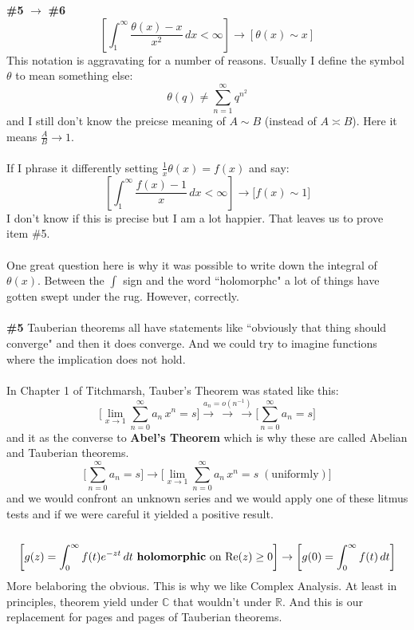 \documentclass[12pt]{article}
\begin{document}
\newpage 

\noindent \textbf{\#5} $\to$ \textbf{\#6}
$$ \left[ \int_1^\infty \frac{\theta(x) - x}{x^2} \, dx < \infty \right] \to \left[ \theta(x) \sim x \right]  $$
This notation is aggravating for a number of reasons.  Usually I define the symbol $\theta$ to mean something else:
$$  \theta(q) \neq \sum_{n=1}^\infty q^{n^2}$$
and I still don't know the preicse meaning of $A\sim B$ (instead of  $A \asymp B$). Here it means $\frac{A}{B} \to 1$. \\ \\ 
If I phrase it differently setting $\frac{1}{x} \theta(x)   = f(x)$ and say:
$$ \left[ \int_1^\infty \frac{f(x)-1}{x} \, dx < \infty \right] \to \big[ f(x) \sim 1 \big]  $$
I don't know if this is precise but I am a lot happier. That leaves us to prove item \#5. \\ \\
One great question here is why it was possible to write down the integral of $\theta(x)$. Between the $\int$ sign and the word ``holomorphc" a lot of things have gotten swept under the rug.  However, correctly. \\ \\
\textbf{\#5} Tauberian theorems all have statements like ``obviously that thing should converge" and then it does converge.  And we could try to imagine functions where the implication does not hold. \\ \\
In Chapter 1 of Titchmarsh, Tauber's Theorem was stated like this:
$$ \Big[ \lim_{x \to 1} \sum_{n = 0}^\infty a_n \, x^n = s \Big] \stackrel{a_n = o(n^{-1})}{\to\,\to \, \to} \Big[ \sum_{n = 0}^\infty a_n = s \Big] $$
and it as the converse to \textbf{Abel's Theorem} which is why these are called Abelian and Tauberian theorems.
$$ \Big[ \sum_{n = 0}^\infty a_n = s \Big]  \to 
\Big[ \lim_{x \to 1} \sum_{n = 0}^\infty a_n \, x^n = s \; (\text{uniformly}) \Big]  $$
and we would confront an unknown series and we would apply one of these litmus tests and if we were careful it yielded a positive result.  \\ \\
$$ \left[ g(z) = \int_0^\infty f(t) e^{-zt} \, dt \text{ \textbf{holomorphic} on }\mathrm{Re}(z) \geq 0\right] \to \left[ g(0) = \int_0^\infty f(t) \, dt \right] $$
More belaboring the obvious.  This is why we like Complex Analysis.  At least in principles, theorem yield under $\mathbb{C}$ that wouldn't under $\mathbb{R}$. And this is our replacement for pages and pages of Tauberian theorems.  \\ \\
\end{document}

